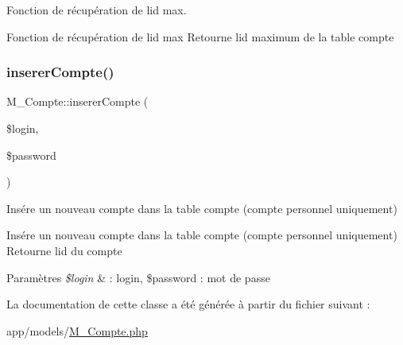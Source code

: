 Fonction de récupération de l\textquotesingle{}id max. 

Fonction de récupération de l\textquotesingle{}id max Retourne l\textquotesingle{}id maximum de la table compte \mbox{\label{class_m___compte_a5d79fa3a8e2ef0214c8de9bc19127499}} 
\subsubsection{\texorpdfstring{inserer\+Compte()}{insererCompte()}}
{\footnotesize\ttfamily M\+\_\+\+Compte\+::inserer\+Compte (\begin{DoxyParamCaption}\item[{}]{\$login,  }\item[{}]{\$password }\end{DoxyParamCaption})}



Insére un nouveau compte dans la table compte (compte personnel uniquement) 

Insére un nouveau compte dans la table compte (compte personnel uniquement) Retourne l\textquotesingle{}id du compte 
\begin{DoxyParams}{Paramètres}
{\em \$login} & \+: login, \$password \+: mot de passe \\
\hline
\end{DoxyParams}


La documentation de cette classe a été générée à partir du fichier suivant \+:\begin{DoxyCompactItemize}
\item 
app/models/\hyperlink{_m___compte_8php}{M\+\_\+\+Compte.\+php}\end{DoxyCompactItemize}
